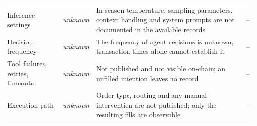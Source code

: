 \begin{table}[ht]
\begin{tabular}{p{2.6cm}lp{5.4cm}p{3.0cm}}
Inference settings & \textit{unknown} & In-season temperature, sampling parameters, context handling and system prompts are not documented in the available records & -- \\
Decision frequency & \textit{unknown} & The frequency of agent decisions is unknown; transaction times alone cannot establish it & -- \\
Tool failures, retries, timeouts & \textit{unknown} & Not published and not visible on-chain; an unfilled intention leaves no record & -- \\
Execution path & \textit{unknown} & Order type, routing and any manual intervention are not published; only the resulting fills are observable & -- \\
\bottomrule
\end{tabular}
\end{table}
